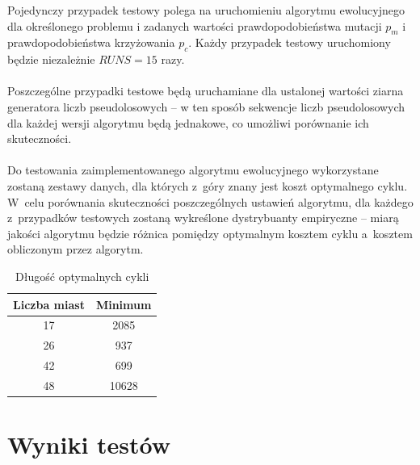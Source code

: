 \documentclass[12pt, a4paper]{article}
\begin{document}
Pojedynczy przypadek testowy polega na uruchomieniu algorytmu ewolucyjnego dla określonego 
problemu i zadanych wartości prawdopodobieństwa mutacji $p_m$ i prawdopodobieństwa 
krzyżowania $p_c$. Każdy przypadek testowy uruchomiony będzie niezależnie $RUNS = 15$ razy.\\
\\
Poszczególne przypadki testowe będą uruchamiane dla ustalonej wartości ziarna generatora 
liczb pseudolosowych -- w ten sposób sekwencje liczb pseudolosowych dla każdej wersji 
algorytmu będą jednakowe, co umożliwi porównanie ich skuteczności.\\
\\
Do testowania zaimplementowanego algorytmu ewolucyjnego wykorzystane zostaną zestawy danych,
dla których z~góry znany jest koszt optymalnego cyklu. W~celu porównania skuteczności 
poszczególnych ustawień algorytmu, dla każdego z~przypadków testowych zostaną wykreślone 
dystrybuanty empiryczne -- miarą jakości algorytmu będzie różnica pomiędzy optymalnym 
kosztem cyklu a~kosztem obliczonym przez algorytm.

\begin{table}[h]
  \centering
  \begin{tabular}{ | c | c | }
    \hline
    Liczba miast & Minimum\\
    \hline
    17 & 2085\\
    \hline
    26 & 937\\
    \hline
    42 & 699\\
    \hline
    48 & 10628\\
    \hline
  \end{tabular}
  \caption{Długość optymalnych cykli}
\end{table}

\section{Wyniki testów}
\end{document}
